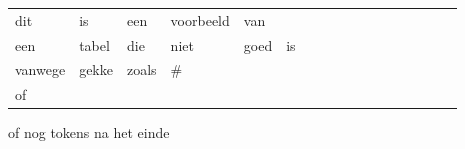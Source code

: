 \begin{tabular}{lllllllllllllllll}
  dit & is & een & voorbeeld & van \\
  een & tabel & die & niet & goed & is \\
  vanwege & gekke & zoals & # & \\
  of & 

  & \\
\end{tabular} of nog tokens na het einde

